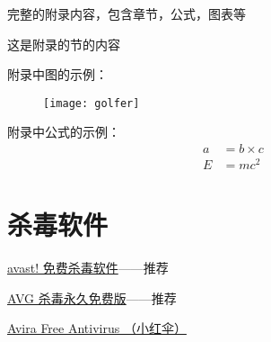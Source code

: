 
\appendix

%
完整的附录内容，包含章节，公式，图表等

这是附录的节的内容

附录中图的示例：
\begin{figure}[htbp]
\centering
\texttt{[image: golfer]}
\vspace{-1em}
\end{figure}

附录中公式的示例：
\begin{align}
a & = b \times c \\
E & = m c^2
\end{align}

\section*{杀毒软件}
\href{http://www.avast.com/zh-cn/free-antivirus-download}{avast! 免费杀毒软件}——推荐

\href{http://www.avg.com/cn-zh/china-avg-antivirus-free}{AVG 杀毒永久免费版}——推荐

\href{http://www.avira.com/en/avira-free-antivirus}{Avira Free Antivirus （小红伞）}









